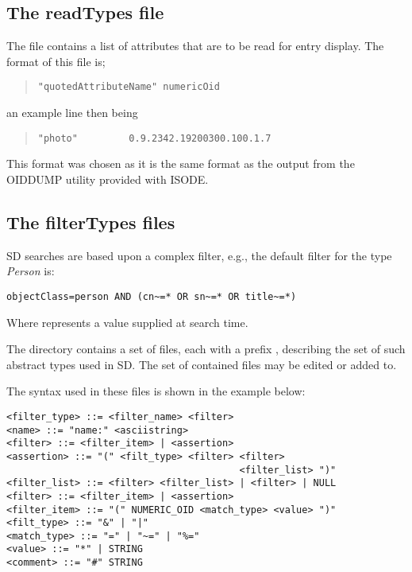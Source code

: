 \subsection {The readTypes file}

The file  contains a list of attributes that are to be read for
entry display.
The format of this file is;
\begin{quote}\small\begin{verbatim}
"quotedAttributeName" numericOid
\end{verbatim}\end{quote}
an example line then being
\begin{quote}\small\begin{verbatim}
"photo"         0.9.2342.19200300.100.1.7
\end{verbatim}\end{quote}

This format was chosen as it is the same format as the output from the OIDDUMP
utility provided with ISODE.

\subsection {The filterTypes files}
	
SD searches are based upon a complex filter,
e.g., the default filter for the type {\em Person} is:
\begin{verbatim}
objectClass=person AND (cn~=* OR sn~=* OR title~=*)
\end{verbatim}
Where \* represents a value supplied at search
time.

The directory  contains a set of files,
each with a prefix ,
describing the set of such abstract types used in SD.
The set of contained files may be edited or added to.

The syntax used in these files is shown in the example below:

\begin{verbatim}
<filter_type> ::= <filter_name> <filter>
<name> ::= "name:" <asciistring>
<filter> ::= <filter_item> | <assertion>
<assertion> ::= "(" <filt_type> <filter> <filter> 
                                         <filter_list> ")"
<filter_list> ::= <filter> <filter_list> | <filter> | NULL
<filter> ::= <filter_item> | <assertion>
<filter_item> ::= "(" NUMERIC_OID <match_type> <value> ")"
<filt_type> ::= "&" | "|"
<match_type> ::= "=" | "~=" | "%="
<value> ::= "*" | STRING
<comment> ::= "#" STRING
\end{verbatim}

